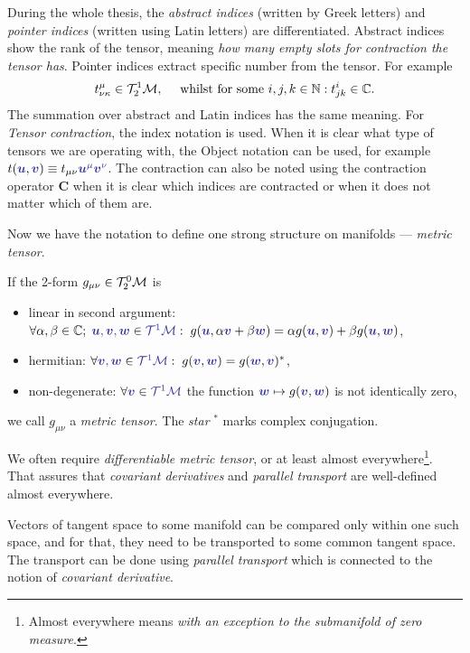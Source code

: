 During the whole thesis, the \emph{abstract indices} (written by Greek letters) and \emph{pointer indices} (written using Latin letters) are differentiated. Abstract indices show the rank of the tensor, meaning \emph{how many empty slots for contraction the tensor has}. Pointer indices extract specific number from the tensor. For example
$$t^\mu_{\nu\kappa} \in \mathcal{T}^1_2\mathcal{M}, \quad \text{ whilst for some }i,j,k\in\mathbb{N}: t^i_{jk}\in \mathbb C.$$
The summation over abstract and Latin indices has the same meaning. For \emph{Tensor contraction}, the index notation is used. When it is clear what type of tensors we are operating with, the Object notation can be used, for example $t(\bluee{\bm u},\bluee{\bm v})\equiv t_{\mu\nu}\bluee{\bm u^\mu \bm v^\nu}$. The contraction can also be noted using the contraction operator $\mathbf C$ when it is clear which indices are contracted or when it does not matter which of them are.

Now we have the notation to define one strong structure on manifolds — \emph{metric tensor}. 
\begin{definition}
If the 2-form $g_{\mu\nu}\in\mathcal{T}^0_2\mathcal{M}$ is
\begin{itemize}
    \item linear in second argument: $\forall \alpha,\beta\in\C;\; \bluee{\bm u,\bm v,\bm w}\in \bluee{\TT^1\M}: \; g(\bluee{\bm u},\alpha\bluee{\bm v}+\beta \bluee{\bm w}) = \alpha g(\bluee{\bm u},\bluee{\bm v})+\beta g(\bluee{\bm u},\bluee{\bm w})$,
    \item hermitian: $\forall \bluee{\bm v,\bm w}\in \bluee{\TT^1\M}: \; g(\bluee{\bm v},\bluee{\bm w})=g(\bluee{\bm w},\bluee{\bm v})^*$,
    \item non-degenerate: $\forall \bluee{\bm v}\in\bluee{\TT^1\M}$ the function $\bluee{\bm w}\mapsto g(\bluee{\bm v},\bluee{\bm w})$ is not identically zero,
\end{itemize} 
we call $g_{\mu\nu}$ a \emph{metric tensor}. The \emph{star} $^*$ marks complex conjugation.
\end{definition}

We often require \emph{differentiable metric tensor}, or at least almost everywhere\footnote{Almost everywhere means \emph{with an exception to the submanifold of zero measure}.}. That assures that \emph{covariant derivatives} and \emph{parallel transport} are well-defined almost everywhere. 




Vectors of tangent space to some manifold can be compared only within one such space, and for that, they need to be transported to some common tangent space. The transport can be done using \emph{parallel transport} which is connected to the notion of \emph{covariant derivative}.

